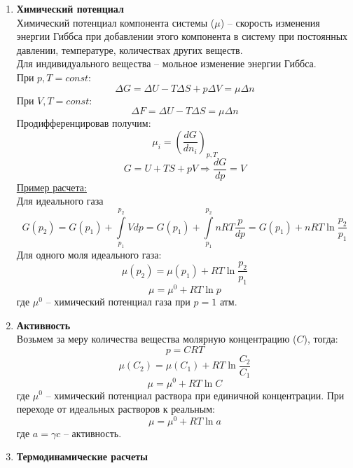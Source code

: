 \documentclass[14pt,a4paper]{scrartcl}
\begin{document}
\begin{enumerate}[label=\arabic*)]
	\item \textbf{Химический потенциал} \\
	Химический потенциал компонента системы ($\mu$) -- скорость изменения энергии Гиббса при добавлении этого компонента в систему при постоянных давлении, температуре, количествах других веществ. \\
	Для индивидуального вещества -- мольное изменение энергии Гиббса. \\
	При $p, T = const $:
	\[
	\Delta{G} = \Delta{U} - T \Delta{S} + p \Delta{V} = \mu \Delta{n}
	\]
	При $V, T = const $:
	\[
	\Delta{F} = \Delta{U} - T \Delta{S} = \mu \Delta{n}
	\]
	Продифференцировав получим:
	\[
	\mu_i = \left(\dfrac{dG}{dn_i}\right)_{p,T}
	\]
	\[
	G = U + TS + pV \Rightarrow \dfrac{dG}{dp} = V
	\]
	\ul{Пример расчета:} \\
	Для идеального газа 
	\[
	G(p_2) = G (p_1) + \int\limits_{p_1}^{p_2} V dp = G(p_1) + \int\limits_{p_1}^{p_2} nRT \dfrac{p}{dp} = G(p_1) + nRT \ln{\dfrac{p_2}{p_1}}	
	\]
	Для одного моля идеального газа:
	\[
	\mu (p_2) = \mu(p_1) + RT \ln{\dfrac{p_2}{p_1}}	
	\]
	\[
	\mu = \mu^0 + RT \ln{p}
	\]
	где $\mu^0$ -- химический потенциал газа при $p = 1$ атм.
	\item \textbf{Активность} \\
	Возьмем за меру количества вещества молярную концентрацию ($C$), тогда:
	$$ p=CRT $$
	\[
	\mu (C_2) = \mu(C_1) + RT \ln{\dfrac{C_2}{C_1}}	
	\]
	\[
	\mu = \mu^0 + RT \ln{C}
	\]
	где $\mu^0$ -- химический потенциал раствора при единичной концентрации.
	При переходе от идеальных растворов к реальным:
	\[
	\mu = \mu^0 + RT \ln{a}
	\]
	где $a = \gamma c$ -- активность. 
	\item \textbf{Термодинамические расчеты} \\
\end{enumerate}
\end{document}
